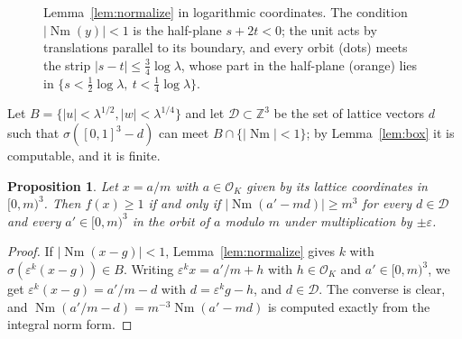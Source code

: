 \documentclass[11pt]{amsart}
\newtheorem{proposition}[theorem]{Proposition}
\theoremstyle{definition}
\theoremstyle{remark}
\numberwithin{equation}{section}
\newcommand{\Z}{\mathbb{Z}}
\newcommand{\cO}{\mathcal{O}}
\newcommand{\Nm}{\operatorname{Nm}}
\begin{document}
\begin{figure}[t]
\centering
{}
\caption{Lemma~\ref{lem:normalize} in logarithmic coordinates. The condition $|\Nm(y)|<1$ is
the half-plane $s+2t<0$; the unit acts by translations parallel to its boundary, and every orbit
(dots) meets the strip $|s-t|\le\frac34\log\lambda$, whose part in the half-plane (orange) lies
in $\{s<\frac12\log\lambda,\ t<\frac14\log\lambda\}$.}
\label{fig:normalize}
\end{figure}

Let $B=\{|u|<\lambda^{1/2},|w|<\lambda^{1/4}\}$ and let $\mathcal D\subset\Z^3$ be the set of
lattice vectors $d$ such that $\sigma([0,1]^3-d)$ can meet $B\cap\{|\Nm|<1\}$; by
Lemma~\ref{lem:box} it is computable, and it is finite.

\begin{proposition}\label{prop:witness}
Let $x=a/m$ with $a\in\cO_K$ given by its lattice coordinates in $[0,m)^3$. Then $f(x)\ge1$ if
and only if $|\Nm(a'-md)|\ge m^3$ for every $d\in\mathcal D$ and every $a'\in[0,m)^3$ in the
orbit of $a$ modulo $m$ under multiplication by $\pm\varepsilon$.
\end{proposition}

\begin{proof}
If $|\Nm(x-g)|<1$, Lemma~\ref{lem:normalize} gives $k$ with $\sigma(\varepsilon^k(x-g))\in B$.
Writing $\varepsilon^kx=a'/m+h$ with $h\in\cO_K$ and $a'\in[0,m)^3$, we get
$\varepsilon^k(x-g)=a'/m-d$ with $d=\varepsilon^kg-h$, and $d\in\mathcal D$. The converse is
clear, and $\Nm(a'/m-d)=m^{-3}\Nm(a'-md)$ is computed exactly from the integral norm form.
\end{proof}
\end{document}
